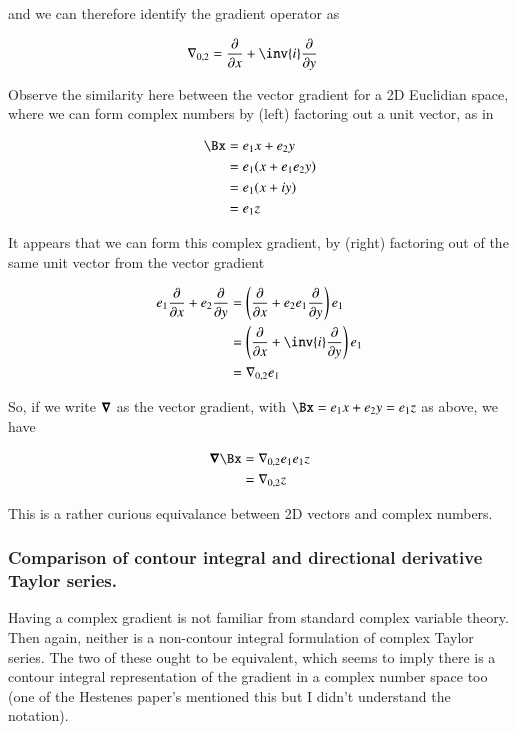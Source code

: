 \documentclass{article}
\begin{document}
and we can therefore identify the gradient operator as

\begin{align*}
\grad_{0,2} &= \PD{x}{} + \inv{i} \PD{y}{} 
\end{align*}

Observe the similarity here between the vector gradient for a 2D Euclidian space, where we can form complex numbers by (left) factoring out a 
unit vector, as in

\begin{align*}
\Bx 
&= e_1 x + e_2 y \\
&= e_1 ( x + e_1 e_2 y ) \\
&= e_1 ( x + i y ) \\
&= e_1 z
\end{align*}

It appears that we can form this complex gradient, by (right) factoring out of the same unit vector from the vector gradient

\begin{align*}
e_1 \PD{x}{} + e_2 \PD{y}{} 
&=
\left( \PD{x}{} + e_2 e_1 \PD{y}{} \right) e_1 \\
&=
\left( \PD{x}{} + \inv{i} \PD{y}{} \right) e_1 \\
&=
\grad_{0,2} e_1 \\
\end{align*}

So, if we write $\boldsymbol{\nabla}$ as the  vector gradient, with $\Bx = e_1 x + e_2 y = e_1 z$ as above, we have

\begin{align*}
\spacegrad \Bx 
&= \grad_{0,2} e_1 e_1 z \\
&= \grad_{0,2} z \\
\end{align*}

This is a rather curious equivalance between 2D vectors and complex numbers.

\subsubsection{ Comparison of contour integral and directional derivative Taylor series. }

Having a complex gradient is not familiar from standard complex variable theory.  Then again, neither is a non-contour integral formulation
of complex Taylor series.  The two of these ought to be equivalent, which seems to imply there is a contour integral representation of the gradient
in a complex number space too (one of the Hestenes paper's mentioned this
but I didn't understand the notation).
\end{document}
